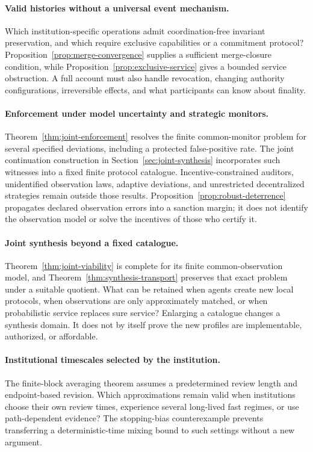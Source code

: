 \documentclass[11pt,letterpaper]{article}
\theoremstyle{plain}
\theoremstyle{definition}
\theoremstyle{remark}
\begin{document}
\paragraph{Valid histories without a universal event mechanism.}
Which institution-specific operations admit coordination-free invariant preservation, and which require exclusive capabilities or a commitment protocol? Proposition~\ref{prop:merge-convergence} supplies a sufficient merge-closure condition, while Proposition~\ref{prop:exclusive-service} gives a bounded service obstruction. A full account must also handle revocation, changing authority configurations, irreversible effects, and what participants can know about finality.

\paragraph{Enforcement under model uncertainty and strategic monitors.}
Theorem~\ref{thm:joint-enforcement} resolves the finite common-monitor problem for several specified deviations, including a protected false-positive rate. The joint continuation construction in Section~\ref{sec:joint-synthesis} incorporates such witnesses into a fixed finite protocol catalogue. Incentive-constrained auditors, unidentified observation laws, adaptive deviations, and unrestricted decentralized strategies remain outside those results. Proposition~\ref{prop:robust-deterrence} propagates declared observation errors into a sanction margin; it does not identify the observation model or solve the incentives of those who certify it.

\paragraph{Joint synthesis beyond a fixed catalogue.}
Theorem~\ref{thm:joint-viability} is complete for its finite common-observation model, and Theorem~\ref{thm:synthesis-transport} preserves that exact problem under a suitable quotient. What can be retained when agents create new local protocols, when observations are only approximately matched, or when probabilistic service replaces sure service? Enlarging a catalogue changes a synthesis domain. It does not by itself prove the new profiles are implementable, authorized, or affordable.

\paragraph{Institutional timescales selected by the institution.}
The finite-block averaging theorem assumes a predetermined review length and endpoint-based revision. Which approximations remain valid when institutions choose their own review times, experience several long-lived fast regimes, or use path-dependent evidence? The stopping-bias counterexample prevents transferring a deterministic-time mixing bound to such settings without a new argument.
\end{document}
